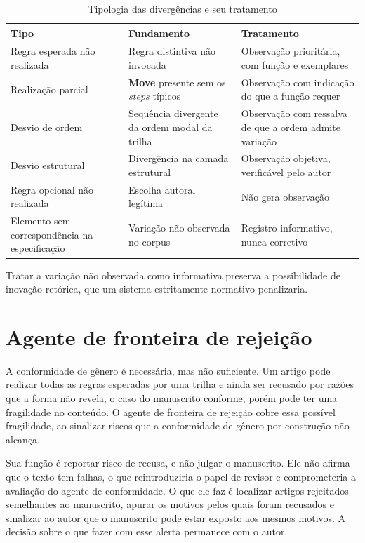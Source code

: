 \begin{table}[H]
\centering
\caption{Tipologia das divergências e seu tratamento}
\label{tab:tipologia}
\small
\begin{tabular}{|p{4.0cm}|p{4.6cm}|p{4.8cm}|}
\hline
\textbf{Tipo} & \textbf{Fundamento} & \textbf{Tratamento} \\
\hline
Regra esperada não realizada & Regra distintiva não invocada \cite{GenresOrgComm} & Observação prioritária, com função e exemplares \\
\hline
Realização parcial & \textbf{Move} presente sem os \textit{steps} típicos \cite{ResearchGenres} & Observação com indicação do que a função requer \\
\hline
Desvio de ordem & Sequência divergente da ordem modal da trilha & Observação com ressalva de que a ordem admite variação \\
\hline
Desvio estrutural & Divergência na camada estrutural & Observação objetiva, verificável pelo autor \\
\hline
Regra opcional não realizada & Escolha autoral legítima \cite{ResearchGenres} & Não gera observação \\
\hline
Elemento sem correspondência na especificação & Variação não observada no corpus & Registro informativo, nunca corretivo \\
\hline
\end{tabular}
\end{table}

Tratar a variação não observada como informativa preserva a possibilidade de inovação retórica, que um sistema estritamente normativo penalizaria.


\section{Agente de fronteira de rejeição}
\label{sec:agente2}

A conformidade de gênero é necessária, mas não suficiente. Um artigo pode realizar todas as regras esperadas por uma trilha e ainda ser recusado por razões que a forma não revela, o caso do manuscrito conforme, porém pode ter uma fragilidade no conteúdo. O agente de fronteira de rejeição cobre essa possível fragilidade, ao sinalizar riscos que a conformidade de gênero por construção não alcança.

Sua função é reportar risco de recusa, e não julgar o manuscrito. Ele não afirma que o texto tem falhas, o que reintroduziria o papel de revisor e comprometeria a avaliação do agente de conformidade. O que ele faz é localizar artigos rejeitados semelhantes ao manuscrito, apurar os motivos pelos quais foram recusados e sinalizar ao autor que o manuscrito pode estar exposto aos mesmos motivos. A decisão sobre o que fazer com esse alerta permanece com o autor.

